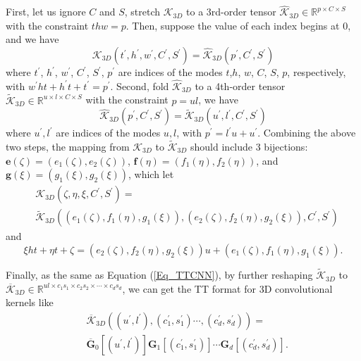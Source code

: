 \documentclass[a4paper,fleqn]{cas-dc}
\begin{document}
First, let us ignore \(C\) and \(S\), stretch \(\bm{\mathcal{K}} _{3D}\) to a 3rd-order tensor \(\widehat{\bm{\mathcal{K}}} _{3D} \in \mathbb{R} ^{p \times C \times S}\) with the constraint \(thw = p\). Then, suppose the value of each index begins at 0, and we have
\begin{equation*}
\mathcal{K}_{3D}(t^{'},h^{'},w^{'},C^{'},S^{'})=\widehat{\mathcal{K}}_{3D}(p^{'},C^{'},S^{'})
\end{equation*}
where \(t^{'}\), \(h^{'}\), \(w^{'}\), \(C^{'}\), \(S^{'}\), \(p^{'}\) are indices of the modes \(t\),\(h\), \(w\), \(C\), \(S\), \(p\), respectively, with \(w^{'}ht + h^{'}t + t^{'} = p^{'}\). Second, fold \(\widehat{\bm{\mathcal{K}}}_{3D}\) to a 4th-order tensor \(\widetilde{\bm{\mathcal{K}}} _{3D} \in \mathbb{R} ^{u \times l \times C \times S}\) with the constraint \(p=ul\), we have
\begin{equation*}
\widehat{\mathcal{K}}_{3D}(p^{'},C^{'},S^{'})=\widetilde{\mathcal{K}}_{3D}(u^{'},l^{'},C^{'},S^{'})
\end{equation*}
where \(u^{'},l^{'}\) are indices of the modes \(u,l\), with \(p^{'}=l^{'}u+u^{'}\). Combining the above two steps, the mapping from \(\bm{\mathcal{K}} _{3D}\) to \(\widetilde{\bm{\mathcal{K}}} _{3D}\) should include 3 bijections: \(\bm{e}(\zeta) = (e_1(\zeta),e_2(\zeta))\), \(\bm{f}(\eta) = (f_1(\eta),f_2(\eta))\), and \(\bm{g}(\xi) = (g_1(\xi),g_2(\xi))\), which let
\begin{equation}\label{Eq_Map_3DCNN}
\begin{aligned}
&\mathcal{K}_{3D}(\zeta,\eta,\xi,C^{'},S^{'})=\\
&\widetilde{\mathcal{K}}_{3D}((e_1(\zeta),f_1(\eta),g_1(\xi)),(e_2(\zeta),f_2(\eta),g_2(\xi)),C^{'},S^{'})
\end{aligned} 
\end{equation}
and
\begin{equation*}
\xi ht + \eta t + \zeta = (e_2(\zeta),f_2(\eta),g_2(\xi))u + (e_1(\zeta),f_1(\eta),g_1(\xi)).
\end{equation*}

Finally, as the same as Equation (\ref{Eq_TTCNN}), by further reshaping \(\widetilde{\bm{\mathcal{K}}}_{3D}\) to \(\overline{\bm{\mathcal{K}}}_{3D} \in \mathbb{R} ^{ul \times c_{1}s_{1} \times c_{2}s_{2} \times \cdots \times c_{d}s_{d}}\), we can get the TT format for 3D convolutional kernels like
\begin{equation}\label{Eq_TT_3DCNN}
\begin{aligned}
&\overline{\mathcal{K}}_{3D}((u^{'},l^{'}),(c_1^{'},s_1^{'})\cdots,(c_d^{'},s_d^{'})) = \\
&\overline{\bm{G}}_0[(u^{'},l^{'})]\bm{G}_1[(c_1^{'},s_1^{'})]\cdots\bm{G}_d[(c_d^{'},s_d^{'})].
\end{aligned}
\end{equation}
\end{document}
